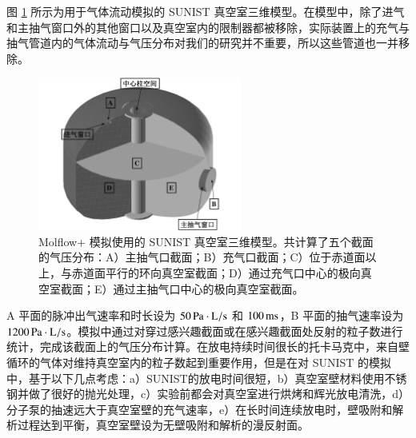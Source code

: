 图 \ref{fig:chap04:vv-3d-model} 所示为用于气体流动模拟的 SUNIST 真空室三维模型。在模型中，除了进气和主抽气窗口外的其他窗口以及真空室内的限制器都被移除，实际装置上的充气与抽气管道内的气体流动与气压分布对我们的研究并不重要，所以这些管道也一并移除。

\begin{figure}%
  \centering
  \includegraphics[width=0.6\textwidth]{moflow-vessel.pdf}
  \caption{Molflow+ 模拟使用的 SUNIST 真空室三维模型。共计算了五个截面的气压分布：A）主抽气口截面；B）充气口截面；C）位于赤道面以上，与赤道面平行的环向真空室截面；D）通过充气口中心的极向真空室截面；E）通过主抽气口中心的极向真空室截面。}
  \label{fig:chap04:vv-3d-model}
\end{figure}

A 平面的脉冲出气速率和时长设为 $50\,{\rm Pa}\cdot{\rm L}/{\rm s}$ 和 $100\,{\rm ms}$，B 平面的抽气速率设为 $1200\,{\rm Pa}\cdot{\rm L}/{\rm s}$。模拟中通过对穿过感兴趣截面或在感兴趣截面处反射的粒子数进行统计，完成该截面上的气压分布计算。在放电持续时间很长的托卡马克中，来自壁循环的气体对维持真空室内的粒子数起到重要作用，但是在对 SUNIST 的模拟中，基于以下几点考虑：a）SUNIST的放电时间很短，b）真空室壁材料使用不锈钢并做了很好的抛光处理，c）实验前都会对真空室进行烘烤和辉光放电清洗，d）分子泵的抽速远大于真空室壁的充气速率，e）在长时间连续放电时，壁吸附和解析过程达到平衡，真空室壁设为无壁吸附和解析的漫反射面。

